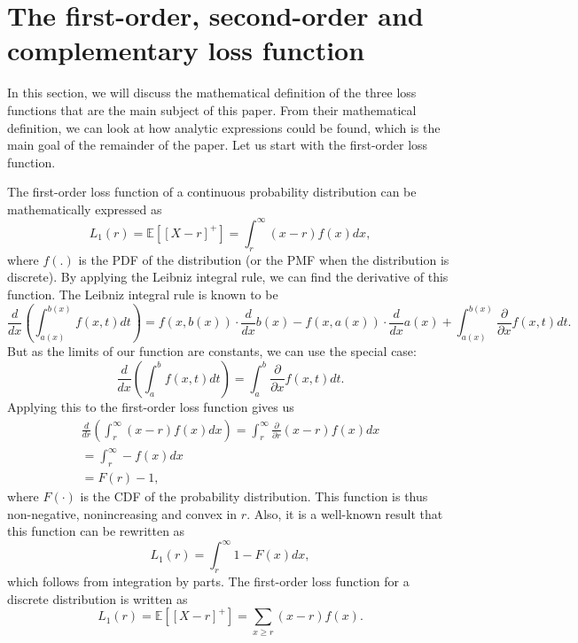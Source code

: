 \documentclass{article}
\begin{document}
\section{The first-order, second-order and complementary loss function}
\begin{flushleft}
    In this section, we will discuss the mathematical definition of the three loss functions that are the main subject of this paper.
    From their mathematical definition, we can look at how analytic expressions could be found, which is the main goal of the remainder of the paper.
    Let us start with the first-order loss function.
\end{flushleft}
\begin{flushleft}
    The first-order loss function of a continuous probability distribution can be mathematically expressed as
    \begin{equation}
        L_1(r) = \mathbb{E}[[X-r]^+] = \int_r^\infty (x-r)f(x)dx,
    \end{equation}
    where $f(.)$ is the PDF of the distribution (or the PMF when the distribution is discrete).
    By applying the Leibniz integral rule, we can find the derivative of this function.
    The Leibniz integral rule is known to be
    \begin{equation*}
        \frac{d}{dx}\left(\int_{a(x)}^{b(x)}f(x, t)dt\right) = f(x, b(x)) \cdot \frac{d}{dx}b(x)-f(x, a(x)) \cdot \frac{d}{dx}a(x)+\int_{a(x)}^{b(x)}\frac{\partial}{\partial x} f(x, t)dt.
    \end{equation*}
    But as the limits of our function are constants, we can use the special case:
    \begin{equation} \label{eq:2}
        \frac{d}{dx}\left(\int_{a}^{b}f(x, t)dt\right) = \int_{a}^{b}\frac{\partial}{\partial x} f(x, t)dt.
    \end{equation}
    Applying this to the first-order loss function gives us
    \begin{equation}
        \begin{gathered}
            \frac{d}{dr}\left(\int_{r}^{\infty} (x-r)f(x)dx\right)  = \int_{r}^{\infty}\frac{\partial}{\partial r} (x-r)f(x)dx \\
            = \int_{r}^{\infty}-f(x)dx                                                                                         \\
            = F(r)-1,
        \end{gathered}
    \end{equation}
    where $F(\cdot)$ is the CDF of the probability distribution.
    This function is thus non-negative, nonincreasing and convex in $r$.
    Also, it is a well-known result that this function can be rewritten as
    \begin{equation}
        L_1(r) = \int_r^\infty 1-F(x) dx,
    \end{equation}
    which follows from integration by parts.
    The first-order loss function for a discrete distribution is written as
    \begin{equation}
        L_1(r) = \mathbb{E}[[X-r]^+] = \sum_{x \ge r} (x-r)f(x).
    \end{equation}
\end{flushleft}
\end{document}
